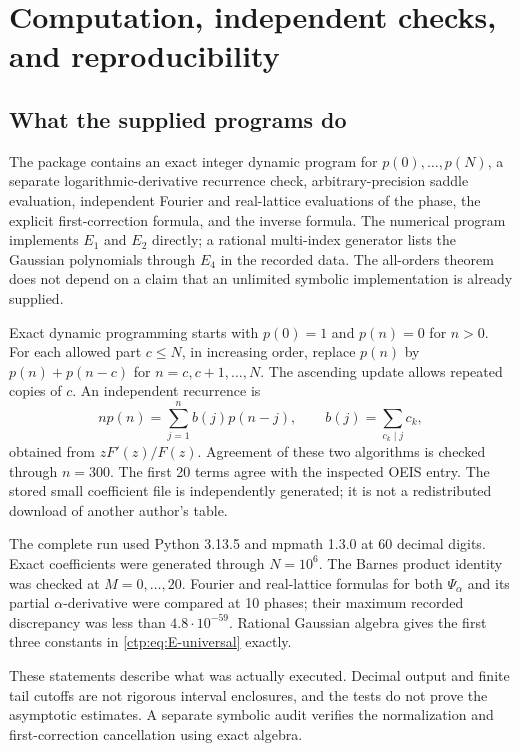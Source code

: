\documentclass[11pt,a4paper]{article}
\numberwithin{equation}{section}
\theoremstyle{definition}
\theoremstyle{remark}
\begin{document}
\section{Computation, independent checks, and reproducibility}
\label{ctp:sec:computation}

\subsection{What the supplied programs do}
The package contains an exact integer dynamic program for $p(0),\ldots,p(N)$,
a separate logarithmic-derivative recurrence check, arbitrary-precision
saddle evaluation, independent Fourier and real-lattice evaluations of the
phase, the explicit first-correction formula, and the inverse formula.
The numerical program implements $E_1$ and $E_2$ directly; a rational
multi-index generator lists the Gaussian polynomials through $E_4$ in the
recorded data. The all-orders theorem does not depend on a claim that an
unlimited symbolic implementation is already supplied.

Exact dynamic programming starts with $p(0)=1$ and $p(n)=0$ for $n>0$.
For each allowed part $c\leq N$, in increasing order, replace
$p(n)$ by $p(n)+p(n-c)$ for $n=c,c+1,\ldots,N$. The ascending update
allows repeated copies of $c$. An independent recurrence is
\begin{equation}\label{ctp:eq:exact-recursion}
 np(n)=\sum_{j=1}^n b(j)p(n-j),\qquad
 b(j)=\sum_{c_k\mid j}c_k,
\end{equation}
obtained from $zF'(z)/F(z)$. Agreement of these two algorithms is checked
through $n=300$. The first 20 terms agree with the inspected OEIS entry.
The stored small coefficient file is independently generated; it is not a
redistributed download of another author's table.

The complete run used Python 3.13.5 and mpmath 1.3.0 at 60 decimal digits.
Exact coefficients were generated through $N=10^6$. The Barnes product
identity was checked at $M=0,\ldots,20$. Fourier and real-lattice formulas
for both $\Psi_\alpha$ and its partial $\alpha$-derivative were compared at
10 phases; their maximum recorded discrepancy was less than
$4.8\cdot10^{-59}$. Rational Gaussian algebra gives the first three
constants in \eqref{ctp:eq:E-universal} exactly.

These statements describe what was actually executed. Decimal output and
finite tail cutoffs are not rigorous interval enclosures, and the tests do
not prove the asymptotic estimates. A separate symbolic audit verifies the
normalization and first-correction cancellation using exact algebra.
\end{document}
